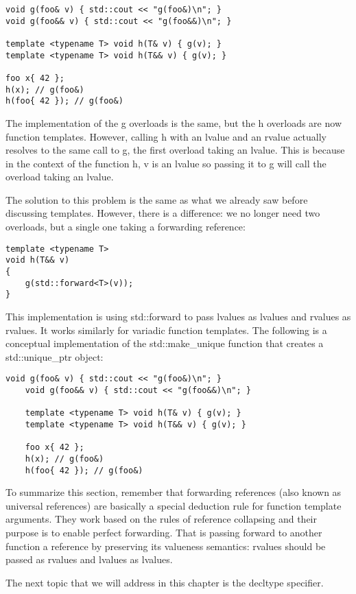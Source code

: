 \begin{lstlisting}[style=styleCXX]
void g(foo& v) { std::cout << "g(foo&)\n"; }
void g(foo&& v) { std::cout << "g(foo&&)\n"; }

template <typename T> void h(T& v) { g(v); }
template <typename T> void h(T&& v) { g(v); }

foo x{ 42 };
h(x); // g(foo&)
h(foo{ 42 }); // g(foo&)
\end{lstlisting}

The implementation of the g overloads is the same, but the h overloads are now function templates. However, calling h with an lvalue and an rvalue actually resolves to the same call to g, the first overload taking an lvalue. This is because in the context of the function h, v is an lvalue so passing it to g will call the overload taking an lvalue.

The solution to this problem is the same as what we already saw before discussing templates. However, there is a difference: we no longer need two overloads, but a single one taking a forwarding reference:

\begin{lstlisting}[style=styleCXX]
template <typename T>
void h(T&& v)
{
	g(std::forward<T>(v));
}
\end{lstlisting}

This implementation is using std::forward to pass lvalues as lvalues and rvalues as rvalues. It works similarly for variadic function templates. The following is a conceptual implementation of the std::make\_unique function that creates a std::unique\_ptr object:

\begin{lstlisting}[style=styleCXX]
	void g(foo& v) { std::cout << "g(foo&)\n"; }
	void g(foo&& v) { std::cout << "g(foo&&)\n"; }
	
	template <typename T> void h(T& v) { g(v); }
	template <typename T> void h(T&& v) { g(v); }
	
	foo x{ 42 };
	h(x); // g(foo&)
	h(foo{ 42 }); // g(foo&)
\end{lstlisting}

To summarize this section, remember that forwarding references (also known as universal references) are basically a special deduction rule for function template arguments. They work based on the rules of reference collapsing and their purpose is to enable perfect forwarding. That is passing forward to another function a reference by preserving its valueness semantics: rvalues should be passed as rvalues and lvalues as lvalues.

The next topic that we will address in this chapter is the decltype specifier.













